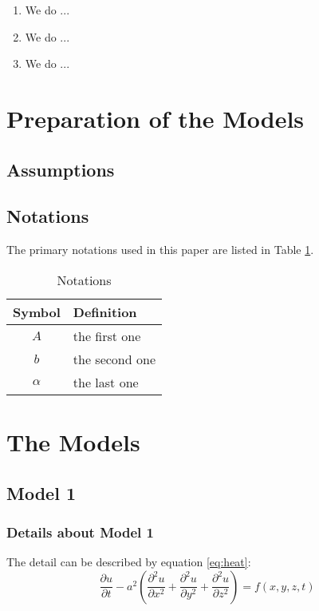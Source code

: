 \documentclass[12pt]{article}  %
\begin{document}
\begin{enumerate}[\bfseries 1.]
    \item We do ...
    \item We do ...
    \item We do ...
\end{enumerate}

\section{Preparation of the Models}
\subsection{Assumptions}

\subsection{Notations}
The primary notations used in this paper are listed in Table \ref{tb:notation}.

\begin{table}[!htbp]
\begin{center}
\caption{Notations}
\begin{tabular}{cl}
	\toprule
	\multicolumn{1}{m{3cm}}{\centering Symbol}
	&\multicolumn{1}{m{8cm}}{\centering Definition}\\
	\midrule
	$A$&the first one\\
	$b$&the second one\\
	$\alpha$ &the last one\\
	\bottomrule
\end{tabular}\label{tb:notation}
\end{center}
\end{table}

\section{The Models}
\subsection{Model 1}
\subsubsection{Details about Model 1}
The detail can be described by equation \eqref{eq:heat}:
\begin{equation}\label{eq:heat}
\frac{\partial u}{\partial t} - a^2 \left( \frac{\partial^2 u}{\partial x^2} + \frac{\partial^2 u}{\partial y^2} + \frac{\partial^2 u}{\partial z^2} \right) = f(x, y, z, t)
\end{equation}
\end{document}

